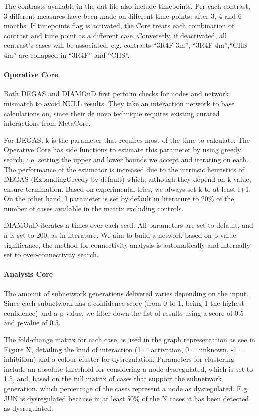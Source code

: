 The contrasts available in the dat file also include timepoints. Per each contrast, 3 different measures have been made on different time points: after 3, 4 and 6 months. If timepoints flag is activated, the Core treats each combination of contrast and time point as a different case. Conversely, if deactivated, all contrast’s cases will be associated, e.g. contrasts “3R4F 3m”, “3R4F 4m”,“CHS 4m” are collapsed in “3R4F” and “CHS”.

\paragraph{Operative Core}
\label{section:desna-o}
Both DEGAS and DIAMOnD first perform checks for nodes and network mismatch to avoid NULL results. They take an interaction network to base calculations on, since their de novo technique requires existing curated interactions from MetaCore.

For DEGAS, k is the parameter that requires most of the time to calculate. The Operative Core has side functions to estimate this parameter by using greedy search, i.e. setting the upper and lower bounds we accept and iterating on each. The performance of the estimator is increased due to the intrinsic heuristics of DEGAS (ExpandingGreedy by default) which, although they depend on k value, ensure termination. Based on experimental tries, we always set k to at least l+1. 
On the other hand, l parameter is set by default in literature to 20\% of the number of cases available in the matrix excluding controls.

DIAMOnD iterates n times over each seed. All parameters are set to default, and n is set to 200, as in literature. We aim to build a network based on p-value significance, the method for connectivity analysis is automatically and internally set to over-connectivity search.

\paragraph{Analysis Core}
The amount of subnetwork generations delivered varies depending on the input. Since each subnetwork has a confidence score (from 0 to 1, being 1 the highest confidence) and a p-value, we filter down the list of results using a score of 0.5 and p-value of 0.5.

The fold-change matrix for each case, is used in the graph representation as see in Figure X, detailing the kind of interaction (1 = activation, 0 = unknown, -1 = inhibition) and a colour cluster for dysregulation. Parameters for clustering include an absolute threshold for considering a node dysregulated, which is set to 1.5, and, based on the full matrix of cases that support the subnetwork generation, which percentage of the cases represent a node as dysregulated. E.g. JUN is dysregulated because in at least 50\% of the N cases it has been detected as dysregulated.


